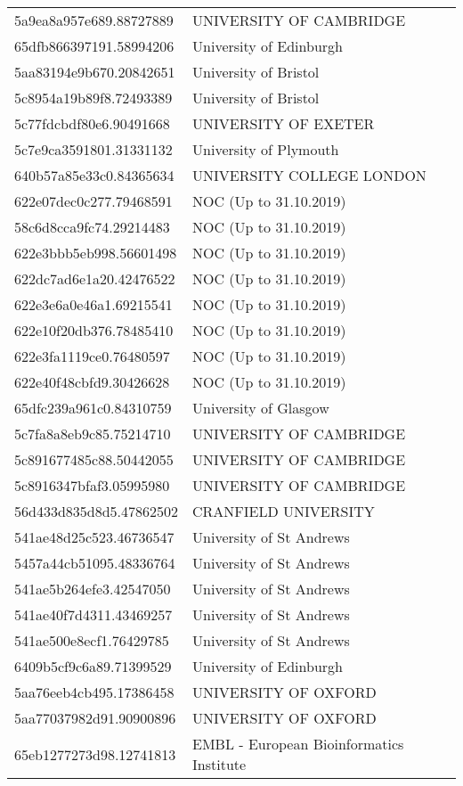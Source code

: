 \begin{tabular}{ll}
5a9ea8a957e689.88727889 & UNIVERSITY OF CAMBRIDGE \\
65dfb866397191.58994206 & University of Edinburgh \\
5aa83194e9b670.20842651 & University of Bristol \\
5c8954a19b89f8.72493389 & University of Bristol \\
5c77fdcbdf80e6.90491668 & UNIVERSITY OF EXETER \\
5c7e9ca3591801.31331132 & University of Plymouth \\
640b57a85e33c0.84365634 & UNIVERSITY COLLEGE LONDON \\
622e07dec0c277.79468591 & NOC (Up to 31.10.2019) \\
58c6d8cca9fc74.29214483 & NOC (Up to 31.10.2019) \\
622e3bbb5eb998.56601498 & NOC (Up to 31.10.2019) \\
622dc7ad6e1a20.42476522 & NOC (Up to 31.10.2019) \\
622e3e6a0e46a1.69215541 & NOC (Up to 31.10.2019) \\
622e10f20db376.78485410 & NOC (Up to 31.10.2019) \\
622e3fa1119ce0.76480597 & NOC (Up to 31.10.2019) \\
622e40f48cbfd9.30426628 & NOC (Up to 31.10.2019) \\
65dfc239a961c0.84310759 & University of Glasgow \\
5c7fa8a8eb9c85.75214710 & UNIVERSITY OF CAMBRIDGE \\
5c891677485c88.50442055 & UNIVERSITY OF CAMBRIDGE \\
5c8916347bfaf3.05995980 & UNIVERSITY OF CAMBRIDGE \\
56d433d835d8d5.47862502 & CRANFIELD UNIVERSITY \\
541ae48d25c523.46736547 & University of St Andrews \\
5457a44cb51095.48336764 & University of St Andrews \\
541ae5b264efe3.42547050 & University of St Andrews \\
541ae40f7d4311.43469257 & University of St Andrews \\
541ae500e8ecf1.76429785 & University of St Andrews \\
6409b5cf9c6a89.71399529 & University of Edinburgh \\
5aa76eeb4cb495.17386458 & UNIVERSITY OF OXFORD \\
5aa77037982d91.90900896 & UNIVERSITY OF OXFORD \\
65eb1277273d98.12741813 & EMBL - European Bioinformatics Institute \\

\end{tabular}
